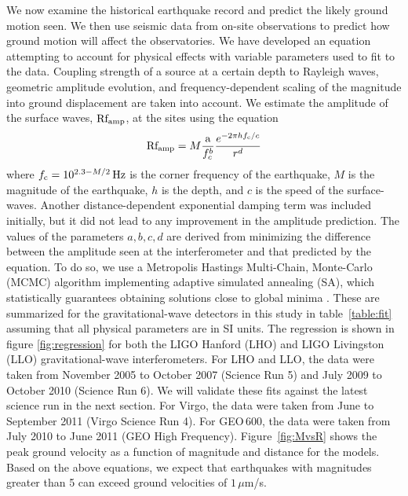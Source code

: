 \documentclass[reprint, prl, aps, showpacs]{revtex4-1}
\begin{document}
We now examine the historical earthquake record and predict the likely ground motion seen. We then use seismic data from on-site observations to predict how ground motion will affect the observatories. We have developed an equation attempting to account for physical effects with variable parameters used to fit to the data. Coupling strength of a source at a certain depth to Rayleigh waves, geometric amplitude evolution, and frequency-dependent scaling of the magnitude into ground displacement are taken into account. We estimate the amplitude of the surface waves, $\rm Rf_{amp}$, at the sites using the equation
\begin{equation}
{\rm Rf_{amp}} = M \frac{\rm a}{f_c^{b}} \frac{e^{-2 \pi h f_{\rm c}/c}}{r^{d}}
\label{eq:Rfamp} 
\end{equation}
where $f_{\rm c} = 10^{2.3-M/2}\,\rm Hz$ is the corner frequency of the earthquake,  $M$ is the magnitude of the earthquake, $h$ is the depth, and $c$ is the speed of the surface-waves. Another distance-dependent exponential damping term was included initially, but it did not lead to any improvement in the amplitude prediction. The values of the parameters $a, b, c, d$ are derived from minimizing the difference between the amplitude seen at the interferometer and that predicted by the equation. To do so, we use a Metropolis Hastings Multi-Chain, Monte-Carlo (MCMC) algorithm implementing adaptive simulated annealing (SA), which statistically guarantees obtaining solutions close to global minima \cite{KiGe1983,In2000}. These are summarized for the gravitational-wave detectors in this study in table~\ref{table:fit} assuming that all physical parameters are in SI units. The regression is shown in figure \ref{fig:regression} for both the LIGO Hanford (LHO) and LIGO Livingston (LLO) gravitational-wave interferometers. For LHO and LLO, the data were taken from November 2005 to October 2007 (Science Run 5) and July 2009 to October 2010 (Science Run 6). We will validate these fits against the latest science run in the next section. For Virgo, the data were taken from June to September 2011 (Virgo Science Run 4). For GEO\,600, the data were taken from July 2010 to June 2011 (GEO High Frequency). Figure~\ref{fig:MvsR} shows the peak ground velocity as a function of magnitude and distance for the models. Based on the above equations, we expect that earthquakes with magnitudes greater than 5 can exceed ground velocities of $1\,\mu$m/s.
\end{document}
